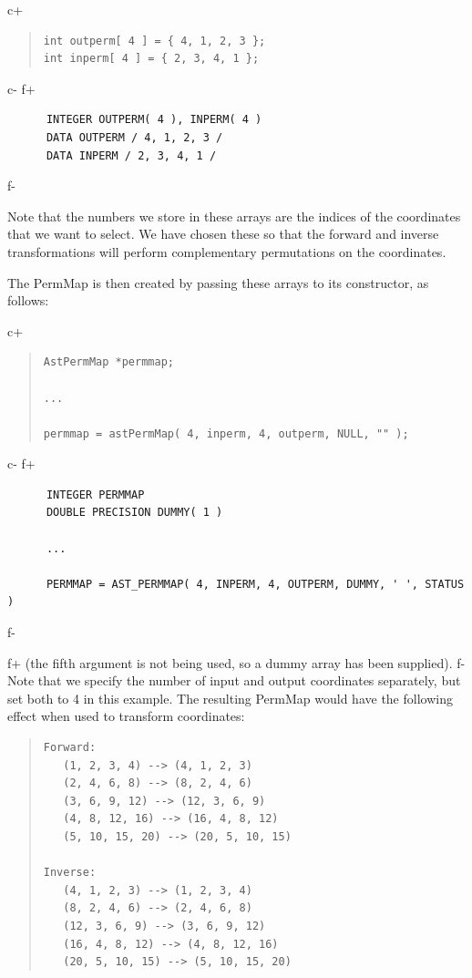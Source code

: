 \documentclass[twoside,11pt]{article}
\begin{document}
c+
\begin{quote}
\small
\begin{verbatim}
int outperm[ 4 ] = { 4, 1, 2, 3 };
int inperm[ 4 ] = { 2, 3, 4, 1 };
\end{verbatim}
\normalsize
\end{quote}
c-
f+
\small
\begin{verbatim}
      INTEGER OUTPERM( 4 ), INPERM( 4 )
      DATA OUTPERM / 4, 1, 2, 3 /
      DATA INPERM / 2, 3, 4, 1 /
\end{verbatim}
\normalsize
f-

Note that the numbers we store in these arrays are the indices of the
coordinates that we want to select. We have chosen these so that the
forward and inverse transformations will perform complementary
permutations on the coordinates.

The PermMap is then created by passing these arrays to its
constructor, as follows:

c+
\begin{quote}
\small
\begin{verbatim}
AstPermMap *permmap;

...

permmap = astPermMap( 4, inperm, 4, outperm, NULL, "" );
\end{verbatim}
\normalsize
\end{quote}
c-
f+
\small
\begin{verbatim}
      INTEGER PERMMAP
      DOUBLE PRECISION DUMMY( 1 )

      ...

      PERMMAP = AST_PERMMAP( 4, INPERM, 4, OUTPERM, DUMMY, ' ', STATUS )
\end{verbatim}
\normalsize
f-

f+
(the fifth argument is not being used, so a dummy array has been supplied).
f-
Note that we specify the number of input and output coordinates
separately, but set both to 4 in this example. The resulting PermMap
would have the following effect when used to transform coordinates:

\begin{quote}
\begin{verbatim}
Forward:
   (1, 2, 3, 4) --> (4, 1, 2, 3)
   (2, 4, 6, 8) --> (8, 2, 4, 6)
   (3, 6, 9, 12) --> (12, 3, 6, 9)
   (4, 8, 12, 16) --> (16, 4, 8, 12)
   (5, 10, 15, 20) --> (20, 5, 10, 15)

Inverse:
   (4, 1, 2, 3) --> (1, 2, 3, 4)
   (8, 2, 4, 6) --> (2, 4, 6, 8)
   (12, 3, 6, 9) --> (3, 6, 9, 12)
   (16, 4, 8, 12) --> (4, 8, 12, 16)
   (20, 5, 10, 15) --> (5, 10, 15, 20)
\end{verbatim}
\end{quote}
\end{document}
